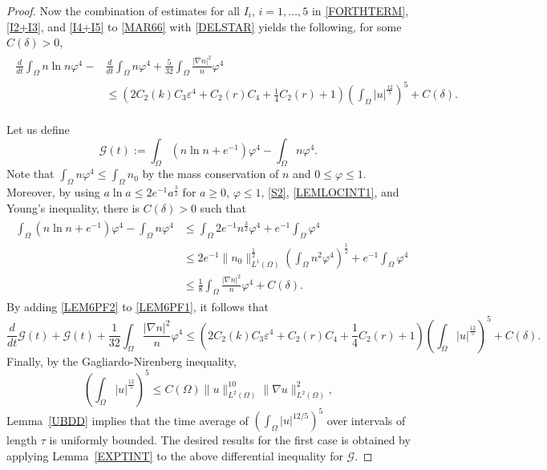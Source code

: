 \documentclass{amsart}
\numberwithin{equation}{section}
\newcommand{\bke}[1]{\left( #1 \right)}
\begin{document}
\begin{proof}
Now the combination of estimates for all $I_i$, $i=1, \ldots, 5$ in \eqref{FORTHTERM}, \eqref{I2+I3}, and \eqref{I4+I5} to \eqref{MAR66} with \eqref{DELSTAR} yields the following, for some  $C(\delta)>0$, 
\begin{align}\label{LEM6PF1}
\begin{aligned} 
\frac{d}{dt} \int_{\Omega}  n\ln n\varphi^{4}-&\frac{d}{dt}\int_{\Omega}n\varphi^{4} +\frac{5}{32} \int_{\Omega} \frac{|\nabla n|^{2}}{n}\varphi^{4}
 \\&\le   \left( 2C_{2}(k)C_{3}\varepsilon^{4}+C_{2}(r)C_{4}+\frac{1}{4}C_{2}(r)+1\right)\bke{\int_{\Omega}|u|^{\frac{12}{5}} }^{5}+C(\delta). 
\end{aligned}
\end{align}


Let us define
\begin{equation}\label{FunctionG}
\mathcal{G}(t):=\int_{\Omega}  (n\ln n+e^{-1}) \varphi^{4}-\int_{\Omega}n\varphi^{4}.
\end{equation}
Note that $\int_\Omega n\varphi^4\le \int_\Omega n_0$ by the mass conservation of $n$ and $0\le\varphi\le 1$.
Moreover, by using $a\ln a\le 2e^{-1}a^{\frac{3}{2}}$ for $a\ge0$, $ \varphi  \le 1$, \eqref{S2}, \eqref{LEMLOCINT1}, and Young's inequality, there is $C(\delta)>0$  such that
\begin{align}\label{LEM6PF2}
\begin{aligned}
\int_{\Omega}  (n\ln n+e^{-1}) \varphi^{4}-\int_{\Omega}n\varphi^{4} &\le \int_{\Omega} 2e^{-1}n^{\frac{3}{2}} \varphi^{4}+e^{-1}\int_{\Omega}\varphi^{4}
\\&\le 2e^{-1} \|n_{0}\|_{L^{1}(\Omega)}^{\frac{1}{2}}\bke{\int_{\Omega}n^{2}\varphi^{4}}^{\frac{1}{2}} +e^{-1}\int_{\Omega}\varphi^{4}
\\&
\le  \frac{1}{8}\int_{\Omega} \frac{|\nabla n|^{2}}{n}\varphi^{4}+C(\delta).
\end{aligned}
\end{align}
By adding \eqref{LEM6PF2} to \eqref{LEM6PF1}, it follows that 
\[
\frac{d}{dt}\mathcal{G}(t)+\mathcal{G}(t) +\frac{1}{32}\int_{\Omega} \frac{|\nabla n|^{2}}{n}\varphi^{4}\le \left( 2C_{2}(k)C_{3}\varepsilon^{4}+C_{2}(r)C_{4}+\frac{1}{4}C_{2}(r)+1 \right) \bke{\int_{\Omega}|u|^{\frac{12}{5}} }^{5}+C(\delta).
\]
Finally, by the Gagliardo-Nirenberg inequality,
\begin{equation}\label{U125}
\bke{\int_{\Omega}|u|^{\frac{12}{5}} }^{5}\le C(\Omega) \|u\|_{L^{2}(\Omega)}^{10}\|\nabla u\|_{L^{2}(\Omega)}^{2},
\end{equation}
Lemma~\ref{UBDD} implies that the time average of $\left(\int_\Omega |u|^{12/5}\right)^5$ over intervals of length $\tau$ is uniformly bounded. The desired results for the first case is obtained by applying Lemma~\ref{EXPTINT} to the above differential inequality for $\mathcal{G}$. 


\end{proof}
\end{document}
